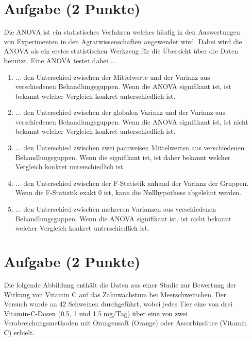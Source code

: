 \documentclass[a4paper, 9pt]{scrartcl}\usepackage[]{graphicx}\usepackage[]{xcolor}
\begin{document}
\section{Aufgabe \hfill (2 Punkte)}

Die ANOVA ist ein statistisches Verfahren welches h{\"a}ufig in den
Auswertungen von Experimenten in den Agrarwissenschaften angewendet
wird. Dabei wird die ANOVA als ein erstes statistischen Werkzeug f{\"u}r die
{\"U}bersicht {\"u}ber die Daten benutzt. Eine ANOVA testet dabei ...



\begin{enumerate}
\item [\textbf{A} \msquare] ... den Unterschied zwischen der Mittelwerte und der Varianz aus verschiedenen Behandlungsguppen. Wenn die ANOVA signifikant ist, ist bekannt welcher Vergleich konkret unterschiedlich ist.
\item [\textbf{B} \msquare] ... den Unterschied zwischen der globalen Varianz und der Varianz aus verschiedenen Behandlungsguppen. Wenn die ANOVA signifikant ist, ist nicht bekannt welcher Vergleich konkret unterschiedlich ist.
\item [\textbf{C} \msquare] ... den Unterschied zwischen zwei paarweisen Mittelwerten aus verschiedenen Behandlungsguppen. Wenn die signifikant ist, ist daher bekannt welcher Vergleich konkret unterschiedlich ist.
\item [\textbf{D} \msquare] ... den Unterschied zwischen der F-Statistik anhand der Varianz der Gruppen. Wenn die F-Statistik exakt 0 ist, kann die Nullhypothese abgelehnt werden.
\item [\textbf{E} \msquare] ... den Unterschied zwischen mehreren Varianzen aus verschiedenen Behandlungsguppen. Wenn die ANOVA signifikant ist, ist nicht bekannt welcher Vergleich konkret unterschiedlich ist.
\end{enumerate} 

\section{Aufgabe \hfill (2 Punkte)}



Die folgende Abbildung enth{\"a}lt die Daten aus einer Studie zur Bewertung der
Wirkung von Vitamin C auf das Zahnwachstum bei Meerschweinchen. Der Versuch
wurde an 42 Schweinen durchgef{\"u}hrt, wobei jedes Tier eine von
drei Vitamin-C-Dosen (0.5, 1 und 1.5 mg/Tag) {\"u}ber eine von zwei
Verabreichungsmethoden mit Orangensaft (Orange) oder Ascorbins{\"a}ure (Vitamin C)
erhielt.
\end{document}
